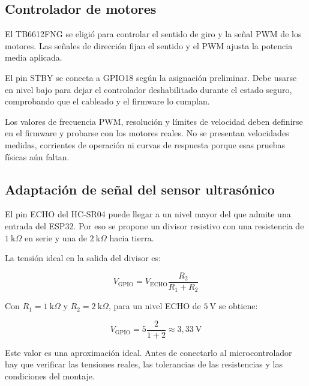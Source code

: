 \documentclass[journal]{IEEEtran}
\begin{document}
\subsection{Controlador de motores}

El TB6612FNG se eligió para controlar el sentido de giro y la señal PWM de los motores. Las señales de dirección fijan el sentido y el PWM ajusta la potencia media aplicada.

El pin STBY se conecta a GPIO18 según la asignación preliminar. Debe usarse en nivel bajo para dejar el controlador deshabilitado durante el estado seguro, comprobando que el cableado y el firmware lo cumplan.

Los valores de frecuencia PWM, resolución y límites de velocidad deben definirse en el firmware y probarse con los motores reales. No se presentan velocidades medidas, corrientes de operación ni curvas de respuesta porque esas pruebas físicas aún faltan.

\subsection{Adaptación de señal del sensor ultrasónico}

El pin ECHO del HC-SR04 puede llegar a un nivel mayor del que admite una entrada del ESP32. Por eso se propone un divisor resistivo con una resistencia de $1~\mathrm{k}\Omega$ en serie y una de $2~\mathrm{k}\Omega$ hacia tierra.

La tensión ideal en la salida del divisor es:

\begin{equation}
V_{\mathrm{GPIO}} =
V_{\mathrm{ECHO}}\frac{R_2}{R_1+R_2}
\label{eq:divisor}
\end{equation}

Con $R_1=1~\mathrm{k}\Omega$ y $R_2=2~\mathrm{k}\Omega$, para un nivel ECHO de $5~\mathrm{V}$ se obtiene:

\begin{equation}
V_{\mathrm{GPIO}} =
5\frac{2}{1+2}
\approx 3{,}33~\mathrm{V}
\label{eq:divisor_calculo}
\end{equation}

Este valor es una aproximación ideal. Antes de conectarlo al microcontrolador hay que verificar las tensiones reales, las tolerancias de las resistencias y las condiciones del montaje.

\end{document}
